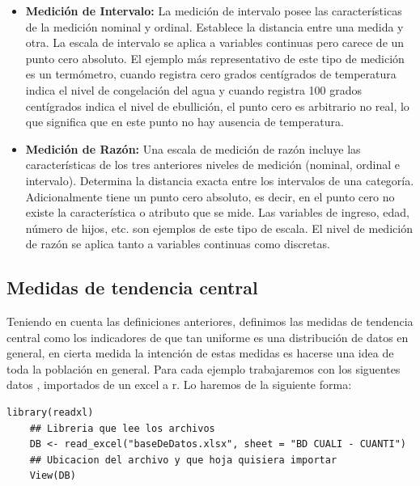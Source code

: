 \documentclass[12pt,hidelinks]{article}
\begin{document}
\begin{itemize}
		\item  \textbf{Medición de Intervalo:} La medición de intervalo posee las características de la medición nominal y ordinal. Establece la distancia entre una medida y otra. La escala de intervalo se aplica a variables continuas pero carece de un punto cero absoluto. El ejemplo más representativo de este tipo de medición es un termómetro, cuando registra cero grados centígrados de temperatura indica el nivel de congelación del agua y cuando registra 100 grados centígrados indica el nivel de ebullición, el punto cero es arbitrario no real, lo que significa que en este punto no hay ausencia de temperatura. 
		\item \textbf{Medición de Razón:} Una escala de medición de razón incluye las características de los tres anteriores niveles de medición (nominal, ordinal e intervalo). Determina la distancia exacta entre los intervalos de una categoría. Adicionalmente tiene un punto cero absoluto, es decir, en el punto cero no existe la característica o atributo que se mide. Las variables de ingreso, edad, número de hijos, etc. son ejemplos de este tipo de escala. El nivel de medición de razón se aplica tanto a variables continuas como discretas. 
	\end{itemize}
	\subsection{Medidas de tendencia central}
	Teniendo en cuenta las definiciones anteriores, definimos las medidas de tendencia central como los indicadores de que tan uniforme es una distribución de datos en general, en cierta medida la intención de estas medidas es hacerse una idea de toda la población en general. Para cada ejemplo trabajaremos con los siguentes datos , importados de un excel a r. Lo haremos de la siguiente forma:
	\begin{lstlisting}[frame=single]
	library(readxl)
	## Libreria que lee los archivos 
	DB <- read_excel("baseDeDatos.xlsx", sheet = "BD CUALI - CUANTI")        
	## Ubicacion del archivo y que hoja quisiera importar 
	View(DB)
	\end{lstlisting}
\end{document}
